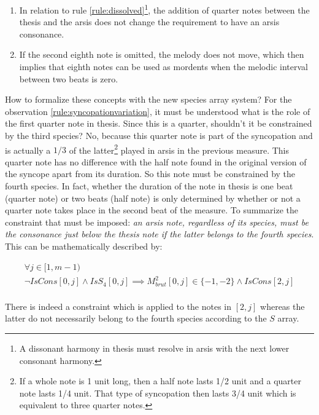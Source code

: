\begin{enumerate}[wide]
    \item \label{rule:syncopationvariation} In relation to rule \ref{rule:dissolved}\footnote{A dissonant harmony in thesis must resolve in arsis with the next lower consonant harmony.}, the addition of quarter notes between the thesis and the arsis does not change the requirement to have an arsis consonance.
    \item \label{rule:crocheaddition} If the second eighth note is omitted, the melody does not move, which then implies that eighth notes can be used as mordents when the melodic interval between two beats is zero.
\end{enumerate}

How to formalize these concepts with the new species array system? For the observation \ref{rule:syncopationvariation}, it must be understood what is the role of the first quarter note in thesis. Since this is a quarter, shouldn't it be constrained by the third species? No, because this quarter note is part of the syncopation and is actually a $1/3$ of the latter\footnote{If a whole note is 1 unit long, then a half note lasts 1/2 unit and a quarter note lasts 1/4 unit. That type of syncopation then lasts 3/4 unit which is equivalent to three quarter notes.} played in arsis in the previous measure. This quarter note has no difference with the half note found in the original version of the syncope apart from its duration. So this note must be constrained by the fourth species. In fact, whether the duration of the note in thesis is one beat (quarter note) or two beats (half note) is only determined by whether or not a quarter note takes place in the second beat of the measure. To summarize the constraint that must be imposed: \textit{an arsis note, regardless of its species, must be the consonance just below the thesis note if the latter belongs to the fourth species}. This can be mathematically described by:

\begin{equation} \label{eq:syncopationvariation}
    \begin{gathered}
        \forall j \in [1, m-1)\\
        \lnot IsCons[0, j] \land IsS_{4}[0, j] \implies M^{2}_{brut}[0, j] \in \{-1, -2\} \land IsCons[2, j]
    \end{gathered}
\end{equation}\\

There is indeed a constraint which is applied to the notes in $[2, j]$ whereas the latter do not necessarily belong to the fourth species according to the $S$ array.\\

